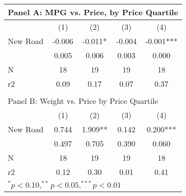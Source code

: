 \begin{tabular}{l*{4}{c}}
\multicolumn{5}{p{\linewidth}}{Panel A: MPG vs. Price, by Price Quartile} \\
\hline\hline
                    &         (1)   &         (2)   &         (3)   &         (4)    \\
\hline
New Road            &     -0.006  &     -0.011*  &     -0.004  &     -0.001***  \\
                    &     0.005        &     0.006        &     0.003        &     0.000        \\
N                   &       18       &       19       &       19       &       18       \\
r2                  &          0.09   &          0.17   &          0.07   &          0.37   \\
\hline & & & & \\

\multicolumn{5}{p{\linewidth}}{Panel B: Weight vs. Price by Price Quartile} \\
\hline\hline
                    &         (1)   &         (2)   &         (3)   &         (4)    \\
\hline
New Road            &     0.744  &     1.909**  &     0.142  &     0.200***  \\
                    &     0.497        &     0.705        &     0.390        &     0.060        \\
N                   &       18       &       19       &       19       &       18       \\
r2                  &          0.12   &          0.30   &          0.01   &          0.41   \\
\hline
\multicolumn{5}{p{\linewidth}}{$^{*}p<0.10, ^{**}p<0.05, ^{***}p<0.01$} \\
\end{tabular}
